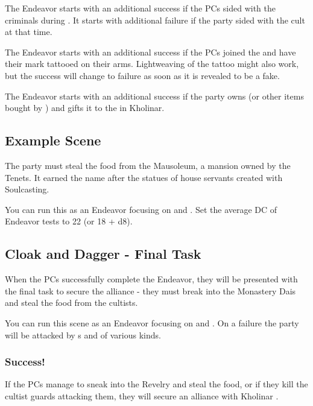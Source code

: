 The Endeavor starts with an additional success if the PCs sided with the criminals during . It starts with additional failure if the party sided with the cult at that time.

The Endeavor starts with an additional success if the PCs joined the \npcFractionGhostbloods{} and have their mark tattooed on their arms. Lightweaving of the tattoo might also work, but the success will change to failure as soon as it is revealed to be a fake.

The Endeavor starts with an additional success if the party owns \lootSeonTube{} (or other items bought by \lootScadrialCoin{}) and gifts it to the \npcFractionGhostbloods{} in Kholinar.


\subsection{Example Scene}

The party must steal the food from the Mausoleum, a mansion owned by the Tenets. It earned the name after the statues of house servants created with Soulcasting.

You can run this as an Endeavor focusing on \skillStealth{} and \skillThievery{}. Set the average DC of Endeavor tests to 22 (or 18 + d8). 




\subsection{Cloak and Dagger - Final Task}
\label{ssec:cloakAndDaggerFinal}

When the PCs successfully complete the Endeavor, they will be presented with the final task to secure the alliance - they must break into the Monastery Dais and steal the food from the cultists.

You can run this scene as an Endeavor focusing on \skillStealth{} and \skillDeception{}. On a failure the party will be attacked by \enemyRevelerSadistic{}s and \enemyCultist{} of various kinds.

\subsubsection{Success!}

If the PCs manage to sneak into the Revelry and steal the food, or if they kill the cultist guards attacking them, they will secure an alliance with Kholinar \npcFractionGhostbloods{}.

